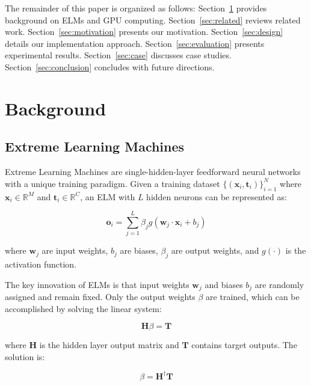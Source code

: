 \documentclass[conference]{IEEEtran}
\begin{document}
The remainder of this paper is organized as follows: Section~\ref{sec:background} provides background on ELMs and GPU computing. Section~\ref{sec:related} reviews related work. Section~\ref{sec:motivation} presents our motivation. Section~\ref{sec:design} details our implementation approach. Section~\ref{sec:evaluation} presents experimental results. Section~\ref{sec:case} discusses case studies. Section~\ref{sec:conclusion} concludes with future directions.

\section{Background}
\label{sec:background}

\subsection{Extreme Learning Machines}

Extreme Learning Machines are single-hidden-layer feedforward neural networks with a unique training paradigm. Given a training dataset $\{(\mathbf{x}_i, \mathbf{t}_i)\}_{i=1}^{N}$ where $\mathbf{x}_i \in \mathbb{R}^M$ and $\mathbf{t}_i \in \mathbb{R}^C$, an ELM with $L$ hidden neurons can be represented as:

\begin{equation}
\mathbf{o}_i = \sum_{j=1}^{L} \beta_j g(\mathbf{w}_j \cdot \mathbf{x}_i + b_j)
\label{eq:elm_output}
\end{equation}

where $\mathbf{w}_j$ are input weights, $b_j$ are biases, $\beta_j$ are output weights, and $g(\cdot)$ is the activation function.

The key innovation of ELMs is that input weights $\mathbf{w}_j$ and biases $b_j$ are randomly assigned and remain fixed. Only the output weights $\beta$ are trained, which can be accomplished by solving the linear system:

\begin{equation}
\mathbf{H}\beta = \mathbf{T}
\label{eq:elm_system}
\end{equation}

where $\mathbf{H}$ is the hidden layer output matrix and $\mathbf{T}$ contains target outputs. The solution is:

\begin{equation}
\beta = \mathbf{H}^{\dagger}\mathbf{T}
\label{eq:elm_solution}
\end{equation}
\end{document}
